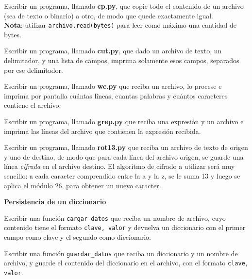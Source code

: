 \begin{ejercicio}
Escribir un programa, llamado {\bf cp.py}, que copie todo el contenido de un
archivo (sea de texto o binario) a otro, de modo que quede exactamente igual.\\
{\bf Nota}: utilizar \lstinline!archivo.read(bytes)! para leer como máximo
una cantidad de bytes.
\end{ejercicio}

\begin{ejercicio}
Escribir un programa, llamado {\bf cut.py}, que dado un archivo de texto, un
delimitador, y una lista de campos, imprima solamente esos campos, separados
por ese delimitador.
\end{ejercicio}

\begin{ejercicio}
Escribir un programa, llamado {\bf wc.py} que reciba un archivo, lo procese e
imprima por pantalla cuántas líneas, cuantas palabras y cuántos caracteres
contiene el archivo.
\end{ejercicio}

\begin{ejercicio}
Escribir un programa, llamado {\bf grep.py} que reciba una expresión y un
archivo e imprima las líneas del archivo que contienen la expresión recibida.
\end{ejercicio}

\begin{ejercicio}
Escribir un programa, llamado {\bf rot13.py} que reciba un archivo de texto de
origen y uno de destino, de modo que para cada línea del archivo origen, se
guarde una línea {\it cifrada} en el archivo destino.  El algoritmo de cifrado
a utilizar será muy sencillo: a cada caracter comprendido entre la a y la z, se
le suma 13 y luego se aplica el módulo 26, para obtener un nuevo caracter.
\end{ejercicio}

\begin{ejercicio} {\bf Persistencia de un diccionario}
\begin{partes}
  \item Escribir una función \lstinline!cargar_datos! que reciba un nombre de
archivo, cuyo contenido tiene el formato \lstinline!clave, valor! y devuelva un
diccionario con el primer campo como clave y el segundo como diccionario.
  \item Escribir una función \lstinline!guardar_datos! que reciba un diccionario
y un nombre de archivo, y guarde el contenido del diccionario en el archivo,
con el formato \lstinline!clave, valor!.
\end{partes}
\end{ejercicio}

